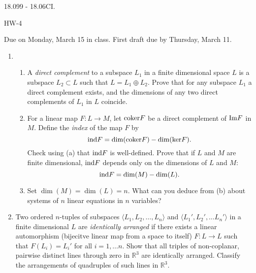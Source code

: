 \documentclass[11pt]{amsart}
\newcommand{\R}{\mathbb R}
\begin{document}
\thispagestyle{empty}

{\Large  18.099 - 18.06CI.} 

\vspace{1cm} 
{\large HW-4} 
 

{Due on Monday, March 15 in class. 
First draft due by Thursday, March 11.}

\vspace{1cm}
 

\begin{enumerate}

\item{ \begin{enumerate} 

\item{A \emph{direct complement} to a subspace $L_1$ in a finite 
dimensional space $L$ is a subspace $L_2 \subset L$ such that 
$L = L_1 \oplus L_2$. 
Prove that for any subspace $L_1$ a direct complement exists, 
and the dimensions 
of any two direct complements of $L_1$ in $L$ coincide. } 
\item{For a linear map $F : L \to M$, let ${\rm coker}F$ be a direct 
complement of ${\rm Im}F$ in $M$. Define the \emph{index} of the map $F$ by 
$$ {\rm ind}F = \dim ({\rm coker} F) - \dim ({\rm ker} F). $$ 
Check using (a) that ${\rm ind}F$ is well-defined. 
Prove that if $L$ and $M$ are finite dimensional, ${\rm ind}F$ 
depends only on the dimensions of $L$ and $M$:  
$$ {\rm ind}F = \dim (M) - \dim (L).$$ }
\item{Set $\dim(M) = \dim(L)=n$. What can you deduce from (b)  
about systems of $n$ linear equations in $n$ variables?} 
\end{enumerate} }

\item{Two ordered $n$-tuples of subspaces 
$\langle L_1, L_2, \ldots , L_n\rangle$ and 
$\langle L_1', L_2', \ldots L_n'\rangle$ in a finite dimensional $L$ 
are \emph{identically arranged} if there exists a linear automorphism 
(bijecitve linear map from a space to itself) $F: L \to L$ 
such that $F(L_i)=L_i'$ for all $i =1, \ldots n$. 
Show that all triples of non-coplanar, pairwise distinct lines through zero in 
$\R^3$ are identically arranged. Classify the arrangements 
of quadruples of such lines in  $\R^3$. }

\end{enumerate} 
\end{document}
